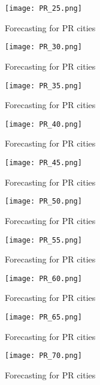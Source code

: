  \begin{figure}[!ht] 
 \centering 
 \texttt{[image: PR\_25.png]} 
 \caption{Forecasting for PR cities } 
 \label{fig:PR_25} 
 \end{figure} 
 
 \begin{figure}[!ht] 
 \centering 
 \texttt{[image: PR\_30.png]} 
 \caption{Forecasting for PR cities } 
 \label{fig:PR_30} 
 \end{figure} 
 
 \begin{figure}[!ht] 
 \centering 
 \texttt{[image: PR\_35.png]} 
 \caption{Forecasting for PR cities } 
 \label{fig:PR_35} 
 \end{figure} 
 
 \begin{figure}[!ht] 
 \centering 
 \texttt{[image: PR\_40.png]} 
 \caption{Forecasting for PR cities } 
 \label{fig:PR_40} 
 \end{figure} 
 
 \begin{figure}[!ht] 
 \centering 
 \texttt{[image: PR\_45.png]} 
 \caption{Forecasting for PR cities } 
 \label{fig:PR_45} 
 \end{figure} 
 
 \begin{figure}[!ht] 
 \centering 
 \texttt{[image: PR\_50.png]} 
 \caption{Forecasting for PR cities } 
 \label{fig:PR_50} 
 \end{figure} 
 
 \begin{figure}[!ht] 
 \centering 
 \texttt{[image: PR\_55.png]} 
 \caption{Forecasting for PR cities } 
 \label{fig:PR_55} 
 \end{figure} 
 
 \begin{figure}[!ht] 
 \centering 
 \texttt{[image: PR\_60.png]} 
 \caption{Forecasting for PR cities } 
 \label{fig:PR_60} 
 \end{figure} 
 
 \begin{figure}[!ht] 
 \centering 
 \texttt{[image: PR\_65.png]} 
 \caption{Forecasting for PR cities } 
 \label{fig:PR_65} 
 \end{figure} 
 
 \begin{figure}[!ht] 
 \centering 
 \texttt{[image: PR\_70.png]} 
 \caption{Forecasting for PR cities } 
 \label{fig:PR_70} 
 \end{figure} 
 
